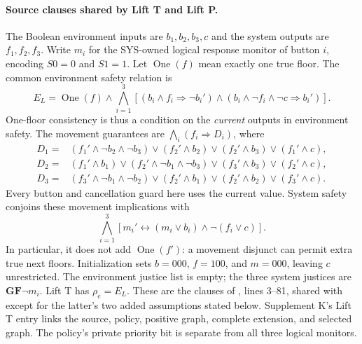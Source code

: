 \paragraph{Source clauses shared by Lift T and Lift P.}
The Boolean environment inputs are $b_1,b_2,b_3,c$ and the system
outputs are $f_1,f_2,f_3$. Write $m_i$ for the SYS-owned logical
response monitor of button $i$, encoding $S0=0$ and $S1=1$.
Let $\operatorname{One}(f)$ mean exactly one true floor. The common
environment safety relation is
\[
E_L=\operatorname{One}(f)\land
\bigwedge_{i=1}^{3}\left[
(b_i\land f_i\Rightarrow\neg b_i')\land
(b_i\land\neg f_i\land\neg c\Rightarrow b_i')\right].
\]
One-floor consistency is thus a condition on the \emph{current}
outputs in environment safety. The movement guarantees are
$\bigwedge_i(f_i\Rightarrow D_i)$, where
\[
\begin{aligned}
D_1={}&(f_1'\land\neg b_2\land\neg b_3)
 \lor(f_2'\land b_2)\lor(f_2'\land b_3)\lor(f_1'\land c),\\
D_2={}&(f_1'\land b_1)
 \lor(f_2'\land\neg b_1\land\neg b_3)
 \lor(f_3'\land b_3)\lor(f_2'\land c),\\
D_3={}&(f_3'\land\neg b_1\land\neg b_2)
 \lor(f_2'\land b_1)\lor(f_2'\land b_2)\lor(f_3'\land c).
\end{aligned}
\]
Every button and cancellation guard here uses the current value.
System safety conjoins these movement implications with
\[
\bigwedge_{i=1}^{3}
\left[m_i'\leftrightarrow(m_i\lor b_i)\land\neg(f_i\lor c)\right].
\]
In particular, it does not add $\operatorname{One}(f')$: a movement
disjunct can permit extra true next floors. Initialization sets
$b=000$, $f=100$, and $m=000$, leaving $c$ unrestricted.
The environment justice list is empty; the three system justices are
$\mathbf{G}\mathbf{F}\neg m_i$. Lift T has $\rho_e=E_L$.
These are the clauses of , lines 3--81,
shared with  except for the latter's
two added assumptions stated below. Supplement K's Lift T entry links
the source, policy, positive graph, complete extension, and selected graph.
The policy's private priority bit is separate from all three logical monitors.


